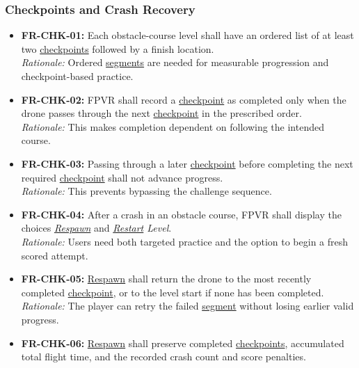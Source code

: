 \documentclass[12pt]{article}
\begin{document}
\subsubsection{Checkpoints and Crash Recovery}
\label{sec:s2-checkpoints}
\begin{itemize}
\item \hypertarget{req:FR-CHK-01}{}\textbf{FR-CHK-01:} Each obstacle-course level shall have an ordered list of at least two \hyperlink{glos:Checkpoint}{checkpoints} followed by a finish location.\\
\textit{Rationale:} Ordered \hyperlink{glos:Checkpoint}{segments} are needed for measurable progression and checkpoint-based practice.
\item \hypertarget{req:FR-CHK-02}{}\textbf{FR-CHK-02:} FPVR shall record a \hyperlink{glos:Checkpoint}{checkpoint} as completed only when the drone passes through the next \hyperlink{glos:Checkpoint}{checkpoint} in the prescribed order.\\
\textit{Rationale:} This makes completion dependent on following the intended course.
\item \hypertarget{req:FR-CHK-03}{}\textbf{FR-CHK-03:} Passing through a later \hyperlink{glos:Checkpoint}{checkpoint} before completing the next required \hyperlink{glos:Checkpoint}{checkpoint} shall not advance progress.\\
\textit{Rationale:} This prevents bypassing the challenge sequence.
\item \hypertarget{req:FR-CHK-04}{}\textbf{FR-CHK-04:} After a crash in an obstacle course, FPVR shall display the choices \emph{\hyperlink{glos:Respawn}{Respawn}} and \emph{\hyperlink{glos:Respawn}{Restart} Level}.\\
\textit{Rationale:} Users need both targeted practice and the option to begin a fresh scored attempt.
\item \hypertarget{req:FR-CHK-05}{}\textbf{FR-CHK-05:} \hyperlink{glos:Respawn}{Respawn} shall return the drone to the most recently completed \hyperlink{glos:Checkpoint}{checkpoint}, or to the level start if none has been completed.\\
\textit{Rationale:} The player can retry the failed \hyperlink{glos:Checkpoint}{segment} without losing earlier valid progress.
\item \hypertarget{req:FR-CHK-06}{}\textbf{FR-CHK-06:} \hyperlink{glos:Respawn}{Respawn} shall preserve completed \hyperlink{glos:Checkpoint}{checkpoints}, accumulated total flight time, and the recorded crash count and score penalties.\\

\end{itemize}
\end{document}
